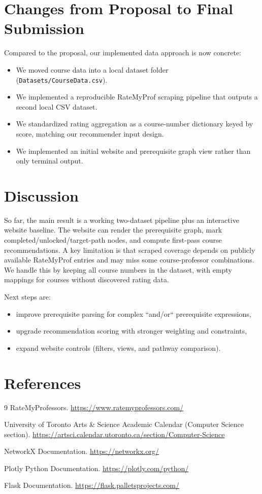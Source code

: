 \documentclass[12pt]{article}
\begin{document}
\section{Changes from Proposal to Final Submission}
Compared to the proposal, our implemented data approach is now concrete:
\begin{itemize}[leftmargin=*]
    \item We moved course data into a local dataset folder (\texttt{Datasets/CourseData.csv}).
    \item We implemented a reproducible RateMyProf scraping pipeline that outputs a second local CSV dataset.
    \item We standardized rating aggregation as a course-number dictionary keyed by score, matching our recommender input design.
    \item We implemented an initial website and prerequisite graph view rather than only terminal output.
\end{itemize}

\section{Discussion}
So far, the main result is a working two-dataset pipeline plus an interactive website baseline. The website can render the prerequisite graph, mark completed/unlocked/target-path nodes, and compute first-pass course recommendations. A key limitation is that scraped coverage depends on publicly available RateMyProf entries and may miss some course-professor combinations. We handle this by keeping all course numbers in the dataset, with empty mappings for courses without discovered rating data.

Next steps are:
\begin{itemize}[leftmargin=*]
    \item improve prerequisite parsing for complex ``and/or`` prerequisite expressions,
    \item upgrade recommendation scoring with stronger weighting and constraints,
    \item expand website controls (filters, views, and pathway comparison).
\end{itemize}

\section{References}
\begin{thebibliography}{9}
RateMyProfessors. \url{https://www.ratemyprofessors.com/}

University of Toronto Arts \& Science Academic Calendar (Computer Science section). \url{https://artsci.calendar.utoronto.ca/section/Computer-Science}

NetworkX Documentation. \url{https://networkx.org/}

Plotly Python Documentation. \url{https://plotly.com/python/}

Flask Documentation. \url{https://flask.palletsprojects.com/}
\end{thebibliography}
\end{document}

